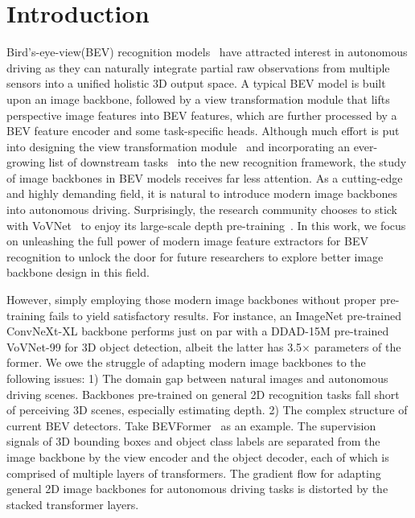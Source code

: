\documentclass[10pt,twocolumn,letterpaper]{article}
\begin{document}
\vspace{-5pt}
\section{Introduction}
Bird's-eye-view(BEV) recognition models~\cite{OFT,pseudo-lidar,VPN,LSS,bevformer,CVT,PETR} have attracted interest in autonomous driving as they can naturally integrate partial raw observations from multiple sensors into a unified holistic 3D output space.
A typical BEV model is built upon an image backbone, followed by a view transformation module that lifts perspective image features into BEV features, which are further processed by a BEV feature encoder and some task-specific heads.
Although much effort is put into designing the view transformation module~\cite{CVT,LSS,bevformer} and incorporating an ever-growing list of downstream tasks~\cite{LSS,fiery} into the new recognition framework, the study of image backbones in BEV models receives far less attention.
As a cutting-edge and highly demanding field, it is natural to introduce modern image backbones into autonomous driving.
Surprisingly, the research community chooses to stick with VoVNet~\cite{Vovnet} to enjoy its large-scale depth pre-training~\cite{DD3D}.
In this work, we focus on unleashing the full power of modern image feature extractors for BEV recognition to unlock the door for future researchers to explore better image backbone design in this field. 

However, simply employing those modern image backbones without proper pre-training fails to yield satisfactory results. 
For instance, an ImageNet \cite{ImageNet} pre-trained ConvNeXt-XL \cite{ConvNext} backbone performs just on par with a DDAD-15M pre-trained VoVNet-99 \cite{DD3D} for 3D object detection, albeit the latter has 3.5$\times$ parameters of the former. 
We owe the struggle of adapting modern image backbones to the following issues: 
1) The domain gap between natural images and autonomous driving scenes.
Backbones pre-trained on general 2D recognition tasks fall short of perceiving 3D scenes, especially estimating depth. 
2) The complex structure of current BEV detectors. 
Take BEVFormer~\cite{bevformer} as an example. The supervision signals of 3D bounding boxes and object class labels are separated from the image backbone by the view encoder and the object decoder, each of which is comprised of multiple layers of transformers. 
The gradient flow for adapting general 2D image backbones for autonomous driving tasks is distorted by the stacked transformer layers.
\end{document}

